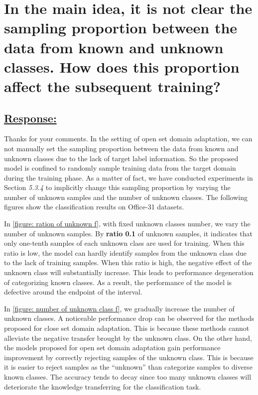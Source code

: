 \renewcommand\thesection{\Roman{section}}

\section{In the main idea, it is not clear the sampling proportion between the data from known and unknown classes. How does this proportion affect the subsequent training?}
\label{Question: class number}
\subsection*{\underline{\textbf{Response:}}}

Thanks for your comments.
In the setting of open set domain adaptation, we can not manually set the sampling proportion between the data from known and unknown classes due to the lack of target label information. 
So the proposed model is confined to randomly sample training data from the target domain during the training phase.
As a matter of fact, we have conducted experiments in Section \textit{5.3.4} to implicitly change this sampling proportion by varying the number of unknown samples and the number of unknown classes.
The following figures show the classification results on Office-31 datasets.



In \figurename{\ref{figure: ration of unknown f}}, with fixed unknown classes number, we vary the number of unknown samples. 
By \textbf{ratio 0.1} of unknown samples, it indicates that only one-tenth samples of each unknown class are used for training.
When this ratio is low, the model can hardly identify samples from the unknown class due to the lack of training samples.
When this ratio is high, the negative effect of the unknown class will substantially increase.
This leads to performance degeneration of categorizing known classes. 
As a result, the performance of the model is defective around the endpoint of the interval.

In \figurename{\ref{figure: number of unknown class f}}, we gradually increase the number of unknown classes.
A noticeable performance drop can be observed for the methods proposed for close set domain adaptation.
This is because these methods cannot alleviate the negative transfer brought by the unknown class.
On the other hand, the models proposed for open set domain adaptation gain performance improvement by correctly rejecting samples of the unknown class.
This is because it is easier to reject samples as the ``unknown'' than categorize samples to diverse known classes.
The accuracy tends to decay since too many unknown classes will deteriorate the knowledge transferring for the classification task.

